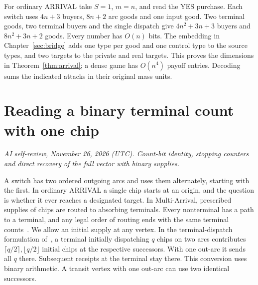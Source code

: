 \documentclass[11pt,oneside,openany,notitlepage]{report}
\newcommand{\reviewdate}{November 26, 2026 (UTC)}
\newcommand{\reviewmark}[1]{\par\nopagebreak[4]\noindent
  {\footnotesize\itshape AI self-review, \reviewdate. #1\par}\nobreak\smallskip}
\begin{document}
For ordinary ARRIVAL take \(S=1\), \(m=n\), and read the YES purchase.
Each switch uses \(4n+3\) buyers, \(8n+2\) arc goods and one input
good. Two terminal goods, two terminal buyers and the single dispatch
give \(4n^2+3n+3\) buyers and \(8n^2+3n+2\) goods. Every number has
\(O(n)\) bits. The embedding in Chapter~\ref{sec:bridge} adds one type
per good and one control type to the source types, and two targets to
the private and real targets. This proves the dimensions in
Theorem~\ref{thm:arrival}; a dense game has \(O(n^4)\) payoff entries.
Decoding sums the indicated attacks in their original mass units.

\chapter{Reading a binary terminal count with one chip}\label{sec:multi}
\reviewmark{Count-bit identity, stopping counters and direct recovery of the full vector with binary supplies.}

A switch has two ordered outgoing arcs and uses them alternately, starting
with the first. In ordinary ARRIVAL a single chip starts at an origin, and
the question is whether it ever reaches a designated target. In
Multi-Arrival, prescribed supplies of chips are routed to absorbing
terminals. Every nonterminal has a path to a terminal, and any legal order
of routing ends with the same terminal counts~\cite[Proposition~4.3]{glm}.
We allow an initial supply at any vertex. In the terminal-dispatch
formulation of~\cite{glm}, a terminal initially dispatching \(q\) chips on
two arcs contributes \(\lceil q/2\rceil,\lfloor q/2\rfloor\) initial chips
at the respective successors. With one out-arc it sends all \(q\) there.
Subsequent receipts at the terminal stay there. This conversion uses binary
arithmetic. A transit vertex with one out-arc can use two identical
successors.
\end{document}
